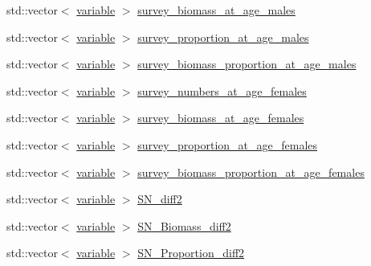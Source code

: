 \begin{DoxyCompactItemize}
\item 
std\-::vector$<$ \hyperlink{structmas_1_1_survey_ae91896013e1a3403f7e3d79b1f845966}{variable} $>$ \hyperlink{structmas_1_1_survey_a65aa83d0a4c0e33a58f933b7712aea76}{survey\-\_\-biomass\-\_\-at\-\_\-age\-\_\-males}
\item 
std\-::vector$<$ \hyperlink{structmas_1_1_survey_ae91896013e1a3403f7e3d79b1f845966}{variable} $>$ \hyperlink{structmas_1_1_survey_ab22021d23ed4557342ebf3af305e95b6}{survey\-\_\-proportion\-\_\-at\-\_\-age\-\_\-males}
\item 
std\-::vector$<$ \hyperlink{structmas_1_1_survey_ae91896013e1a3403f7e3d79b1f845966}{variable} $>$ \hyperlink{structmas_1_1_survey_a81ba97fe092ee36ab133aa4416a883d4}{survey\-\_\-biomass\-\_\-proportion\-\_\-at\-\_\-age\-\_\-males}
\item 
std\-::vector$<$ \hyperlink{structmas_1_1_survey_ae91896013e1a3403f7e3d79b1f845966}{variable} $>$ \hyperlink{structmas_1_1_survey_ab098ff5aa484ec1564b4dbaf9c9df95c}{survey\-\_\-numbers\-\_\-at\-\_\-age\-\_\-females}
\item 
std\-::vector$<$ \hyperlink{structmas_1_1_survey_ae91896013e1a3403f7e3d79b1f845966}{variable} $>$ \hyperlink{structmas_1_1_survey_a150871da567d1b9e5bd7835537a1ae94}{survey\-\_\-biomass\-\_\-at\-\_\-age\-\_\-females}
\item 
std\-::vector$<$ \hyperlink{structmas_1_1_survey_ae91896013e1a3403f7e3d79b1f845966}{variable} $>$ \hyperlink{structmas_1_1_survey_a8e55c1393d70b3354b7670ed20065af4}{survey\-\_\-proportion\-\_\-at\-\_\-age\-\_\-females}
\item 
std\-::vector$<$ \hyperlink{structmas_1_1_survey_ae91896013e1a3403f7e3d79b1f845966}{variable} $>$ \hyperlink{structmas_1_1_survey_a686876186e69ee392fb4ce0a481863ee}{survey\-\_\-biomass\-\_\-proportion\-\_\-at\-\_\-age\-\_\-females}
\item 
std\-::vector$<$ \hyperlink{structmas_1_1_survey_ae91896013e1a3403f7e3d79b1f845966}{variable} $>$ \hyperlink{structmas_1_1_survey_aa01ce2732a42f7580f1803cef493370f}{S\-N\-\_\-diff2}
\item 
std\-::vector$<$ \hyperlink{structmas_1_1_survey_ae91896013e1a3403f7e3d79b1f845966}{variable} $>$ \hyperlink{structmas_1_1_survey_a3394b3a1fbc6ac6c788cde5411b6e9e3}{S\-N\-\_\-\-Biomass\-\_\-diff2}
\item 
std\-::vector$<$ \hyperlink{structmas_1_1_survey_ae91896013e1a3403f7e3d79b1f845966}{variable} $>$ \hyperlink{structmas_1_1_survey_ad8f4967194f0217375577ef06e99df73}{S\-N\-\_\-\-Proportion\-\_\-diff2}
\item 

\end{DoxyCompactItemize}

